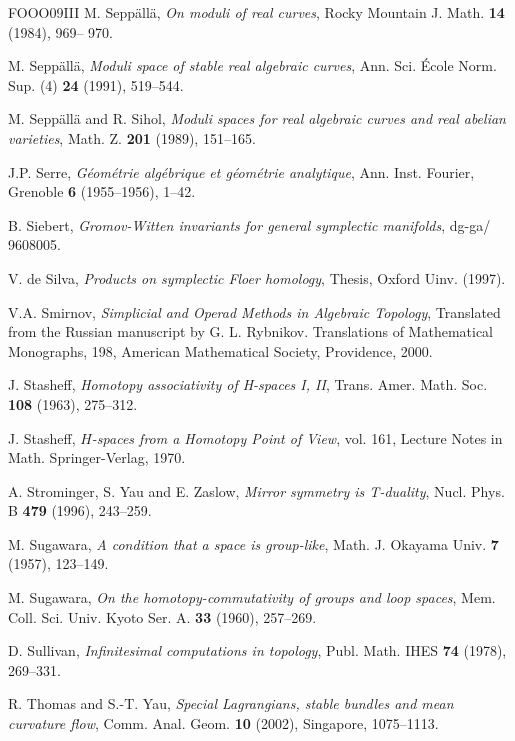 \begin{thebibliography}{FOOO09III}
 M. Seppällä, \emph{On moduli of real curves}, Rocky Mountain J. Math. \textbf{14} (1984), 969– 970.

 M. Seppällä, \emph{Moduli space of stable real algebraic curves}, Ann. Sci. École Norm. Sup. (4) \textbf{24} (1991), 519–544.

 M. Seppällä and R. Sihol, \emph{Moduli spaces for real algebraic curves and real abelian varieties}, Math. Z. \textbf{201} (1989), 151–165.

 J.P. Serre, \emph{Géométrie algébrique et géométrie analytique}, Ann. Inst. Fourier, Grenoble \textbf{6} (1955–1956), 1–42.

 B. Siebert, \emph{Gromov-Witten invariants for general symplectic manifolds}, dg-ga/ 9608005.

 V. de Silva, \emph{Products on symplectic Floer homology}, Thesis, Oxford Uinv. (1997).

 V.A. Smirnov, \emph{Simplicial and Operad Methods in Algebraic Topology}, Translated from the Russian manuscript by G. L. Rybnikov. Translations of Mathematical Monographs, 198, American Mathematical Society, Providence, 2000.

 J. Stasheff, \emph{Homotopy associativity of H-spaces I, II}, Trans. Amer. Math. Soc. \textbf{108} (1963), 275–312.

 J. Stasheff, \emph{\(H\)-spaces from a Homotopy Point of View}, vol. 161, Lecture Notes in Math. Springer-Verlag, 1970.

 A. Strominger, S. Yau and E. Zaslow, \emph{Mirror symmetry is T-duality}, Nucl. Phys. B \textbf{479} (1996), 243–259.

 M. Sugawara, \emph{A condition that a space is group-like}, Math. J. Okayama Univ. \textbf{7} (1957), 123–149.

 M. Sugawara, \emph{On the homotopy-commutativity of groups and loop spaces}, Mem. Coll. Sci. Univ. Kyoto Ser. A. \textbf{33} (1960), 257–269.

 D. Sullivan, \emph{Infinitesimal computations in topology}, Publ. Math. IHES \textbf{74} (1978), 269–331.

 R. Thomas and S.-T. Yau, \emph{Special Lagrangians, stable bundles and mean curvature flow}, Comm. Anal. Geom. \textbf{10} (2002), Singapore, 1075–1113.


\end{thebibliography}
